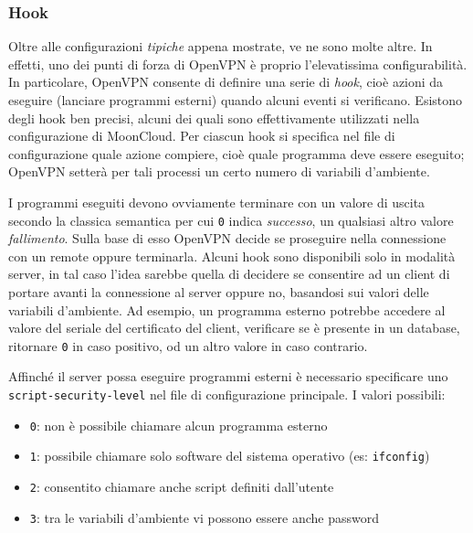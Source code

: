 \subsubsection{Hook}
Oltre alle configurazioni \textit{tipiche} appena mostrate, ve ne sono molte altre. In effetti,
uno dei punti di forza di OpenVPN è proprio l'elevatissima configurabilità.
In particolare, OpenVPN consente di definire una serie di \textit{hook},
cioè azioni da eseguire (lanciare programmi esterni) quando alcuni eventi si verificano.
Esistono degli hook ben precisi, alcuni dei quali sono effettivamente utilizzati
nella configurazione di MoonCloud. Per ciascun hook si specifica nel file di configurazione
quale azione compiere, cioè quale programma deve essere eseguito;
OpenVPN setterà per tali processi un certo numero di variabili d'ambiente.

I programmi eseguiti devono ovviamente terminare con un valore di uscita secondo
la classica semantica per cui \texttt{0} indica \textit{successo}, un qualsiasi
altro valore \textit{fallimento}. Sulla base
di esso OpenVPN decide se proseguire nella connessione con un remote oppure terminarla.
Alcuni hook sono disponibili solo in modalità server, in tal caso
l'idea sarebbe quella di decidere se consentire ad un client di portare avanti
la connessione al server oppure no, basandosi sui valori delle variabili d'ambiente.
Ad esempio, un programma esterno potrebbe accedere al valore del seriale del certificato
del client, verificare se è presente in un database, ritornare \texttt{0} in caso
positivo, od un altro valore in caso contrario.

Affinché il server possa eseguire programmi esterni è necessario specificare uno
\texttt{script-security-level} nel file di configurazione principale. I valori possibili:
\begin{itemize}
  \item \texttt{0}: non è possibile chiamare alcun programma esterno
  \item \texttt{1}: possibile chiamare solo software del sistema operativo (es: \texttt{ifconfig})
  \item \texttt{2}: consentito chiamare anche script definiti dall'utente
  \item \texttt{3}: tra le variabili d'ambiente vi possono essere anche password
\end{itemize}

